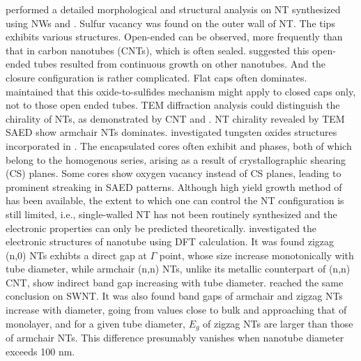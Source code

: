 \citeauthor{Zhu2000} performed a detailed morphological and structural analysis on  NT synthesized using  NWs and .\cite{Zhu2000} Sulfur vacancy was found on the outer wall of NT. The tips exhibits various structures. Open-ended can be observed, more frequently than that in carbon nanotubes (CNTs), which is often sealed. \citeauthor{Zhu2000} suggested this open-ended tubes resulted from continuous growth on other nanotubes. And the closure configuration is rather complicated. Flat caps often dominates. \citeauthor{Zhu2000} maintained that this oxide-to-sulfides mechanism might apply to closed caps only, not to those open ended tubes.\cite{Zhu2000} TEM diffraction analysis could distinguish the chirality of NTs, as demonstrated by CNT \cite{Zhang1993} and \cite{MARGULIS1996}.  NT chirality revealed by TEM SAED show armchair NTs dominates. \citeauthor{Sloan1999} investigated tungsten oxides structures incorporated in .\cite{Sloan1999} The encapsulated  cores often exhibit  and  phases, both of which belong to the  homogenous series, arising as a result of crystallographic shearing (CS) planes.\cite{Miyano} Some  cores show oxygen vacancy instead of CS planes, leading to prominent streaking in SAED patterns. Although high yield growth method of  has been available, the extent to which one can control the NT configuration is still limited, i.e., single-walled NT has not been routinely synthesized and the electronic properties can only be predicted theoretically. \citeauthor{Seifert2000} investigated the electronic structures of  nanotube using DFT calculation.\cite{Seifert2000} It was found zigzag (n,0) NTs exhibts a direct gap at $\Gamma$ point, whose size increase monotonically with tube diameter, while armchair (n,n) NTs, unlike its metallic counterpart of (n,n) CNT, show indirect band gap increasing with tube diameter. \citeauthor{Zibouche2012} reached the same conclusion on  SWNT.\cite{Zibouche2012} It was also found band gaps of armchair and zigzag NTs increase with diameter, going from values close to bulk and approaching that of  monolayer, and for a given tube diameter, $E_g$ of zigzag NTs are larger than those of armchair NTs. This difference presumably vanishes when nanotube diameter exceeds 100 nm.


